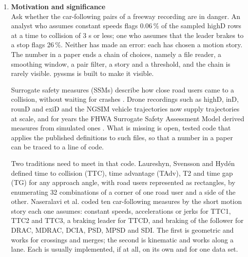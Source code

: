 \documentclass[preprint,12pt, a4paper]{elsarticle}
\begin{document}
\begin{enumerate}

\item \textbf{Motivation and significance}\label{sec:motivation}\\

Ask whether the car-following pairs of a freeway recording are in danger. An analyst who assumes constant speeds flags 0.06\,\% of the sampled highD rows at a time to collision of 3 s or less; one who assumes that the leader brakes to a stop flags 26\,\%. Neither has made an error: each has chosen a motion story. The number in a paper ends a chain of choices, namely a file reader, a smoothing window, a pair filter, a story and a threshold, and the chain is rarely visible. pyssms is built to make it visible.

Surrogate safety measures (SSMs) describe how close road users came to a collision, without waiting for crashes \cite{arun2021,zheng2021}. Drone recordings such as highD, inD, rounD and exiD \cite{krajewski2018,bock2020,krajewski2020,moers2022} and the NGSIM vehicle trajectories \cite{ngsim2017} now supply trajectories at scale, and for years the FHWA Surrogate Safety Assessment Model derived measures from simulated ones \cite{gettman2003}. What is missing is open, tested code that applies the published definitions to such files, so that a number in a paper can be traced to a line of code.

Two traditions need to meet in that code. Laureshyn, Svensson and Hydén \cite{laureshyn2010} defined time to collision (TTC), time advantage (TAdv), T2 and time gap (TG) for any approach angle, with road users represented as rectangles, by enumerating 32 combinations of a corner of one road user and a side of the other. Naseralavi et al. \cite{naseralavi2025} coded ten car-following measures by the short motion story each one assumes: constant speeds, accelerations or jerks for TTC1, TTC2 and TTC3, a braking leader for TTCD, and braking of the follower for DRAC, MDRAC, DCIA, PSD, MPSD and SDI. The first is geometric and works for crossings and merges; the second is kinematic and works along a lane. Each is usually implemented, if at all, on its own and for one data set.


\end{enumerate}
\end{document}
